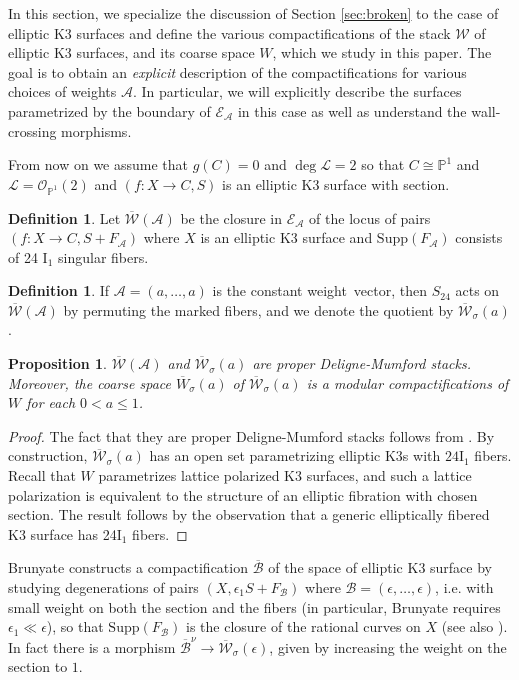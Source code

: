 \documentclass[11pt]{amsart}
\newtheorem{prop}[theorem]{Proposition}
\theoremstyle{definition}
\newtheorem{definition}[theorem]{Definition}
\theoremstyle{remark}
\newcommand{\calO}{\mathcal O}
\newcommand{\calA}{\mathcal A}
\newcommand{\calB}{\mathcal B}
\newcommand{\calW}{\mathcal W}
\newcommand{\calE}{\mathcal E}
\newcommand{\mb}[1]{\mathbb{#1}}
\newcommand{\ka}{\overline{\calW}(\calA)}
\newcommand{\ska}{\overline{\calW}_\sigma(a)}
\newcommand{\bru}{\overline{\mathscr{B}}}
\begin{document}
	In this section, we specialize the discussion of Section \ref{sec:broken} to the case of elliptic K3 surfaces and define the various compactifications of the stack $\calW$ of elliptic K3 surfaces, and its coarse space $W$, which we study in this paper. The goal is to obtain an \emph{explicit} description of the compactifications for various choices of weights $\calA$. In particular, we will explicitly describe the surfaces parametrized by the boundary of $\calE_\calA$ in this case as well as understand the wall-crossing morphisms.
	
	From now on we assume that $g(C) = 0$ and $\deg \mathscr{L} = 2$ so that $C \cong \mb{P}^1$ and $\mathscr{L} = \calO_{\mathbb{P}^1}(2)$ and $(f : X \to C, S)$ is an elliptic K3 surface with section. 
	
	
	\begin{definition}\label{def:es} Let $\ka$ be the closure in $\mathcal{E}_{\calA}$ of the locus of pairs $(f : X \to C, S +F_\calA)$ where $X$ is an elliptic K3 surface and $\mathrm{Supp}(F_\calA)$ consists of 24 $\mathrm{I}_1$ singular fibers.\end{definition}
	
	\begin{definition} If $\calA = (a, \dots, a)$ is the constant weight\ vector, then $S_{24}$ acts on $\ka$ by permuting the marked fibers, and we denote the quotient by $\ska$. \end{definition}
	
	
	\begin{prop}\label{prop:latticeksba} $\ka$ and $\ska$ are proper Deligne-Mumford stacks. Moreover, the coarse space $\overline{W}_\sigma(a)$ of $\ska$ is a modular compactifications of $W$ for each $0 < a \le 1$.  \end{prop}
	
	\begin{proof}
		The fact that they are proper Deligne-Mumford stacks follows from \cite{master}. By construction, $\ska$ has an open set parametrizing elliptic K3s with $24\mathrm{I}_1$ fibers. Recall that $W$ parametrizes lattice polarized K3 surfaces, and such a lattice polarization is equivalent to the structure of an elliptic fibration with chosen section. The result follows by the observation that a generic elliptically fibered K3 surface has 24$\mathrm{I}_1$ fibers. \end{proof}
	
	
	
	Brunyate constructs a compactification $\bru$ of the space of elliptic K3 surface by studying degenerations of pairs $(X, \epsilon_1 S + F_{\calB})$ where $\calB = (\epsilon, \ldots, \epsilon)$, i.e. with small weight on both the section and the fibers (in particular, Brunyate requires $\epsilon_1 \ll \epsilon$), so that $\text{Supp}(F_\calB)$ is the closure of the rational curves on $X$ \cite{brunyate} (see also \cite[Section 7]{abe}). In fact there is a morphism $\bru^\nu \to \overline{\mathcal{W}}_\sigma(\epsilon)$, given by increasing the weight on the section to $1$. 
	
\end{document}
